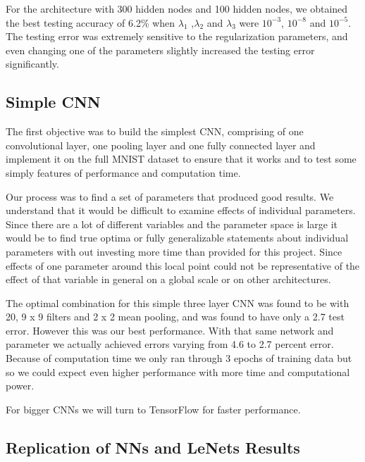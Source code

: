 \documentclass[12pt, twocolumn]{article}
\begin{document}
For the architecture with 300 hidden nodes and 100 hidden nodes, we obtained the best testing accuracy of 6.2\% when $\lambda_1$ ,$\lambda_2$ and $\lambda_3$ were $10^{-3}$, $10^{-8}$ and $10^{-5}$. The testing error was extremely sensitive to  the regularization parameters, and even changing one of the parameters slightly increased the testing error significantly. 

\subsection{Simple CNN}
The first objective was to build the simplest CNN, comprising of one convolutional layer, one pooling layer and one fully connected layer and implement it on the full MNIST dataset to ensure that it works and to test some simply features of performance and computation time.  

Our process was to find a set of parameters that produced good results. We understand that it would be difficult to examine effects of individual parameters. Since there are a lot of different variables and the parameter space is large it would be to find true optima or fully generalizable statements about individual parameters with out investing more time than provided for this project. Since effects of one parameter around this local point could not be representative of the effect of that variable in general on a global scale or on other architectures. 

The optimal combination for this simple three layer CNN was found to be with 20, 9 x 9 filters and 2 x 2 mean pooling, and was found to have only a 2.7 test error. However this was our best performance. With that same network and parameter we actually achieved errors varying from 4.6 to 2.7 percent error. Because of computation time we only ran through 3 epochs of training data but so we could expect even  higher performance with more time and computational power. 


For bigger CNNs we will turn to TensorFlow for faster performance. 
\subsection{Replication of NNs and LeNets Results}
\end{document}
